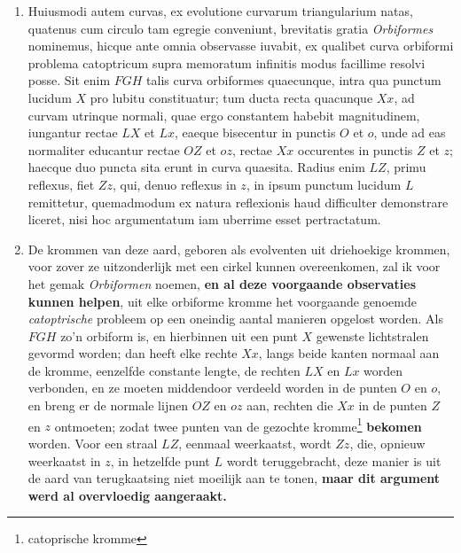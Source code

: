 \documentclass[10pt,a4paper]{article}
\newcommand{\switchenum}{\setcounter{enumi}{\arabic{enumi}-1}\switchcolumn}
\begin{document}
\begin{paracol}{2}
\begin{enumerate}[topsep=1px]
		
		\switchcolumn*
		
		
		
		\item Huiusmodi autem curvas, ex evolutione curvarum triangularium natas, quatenus cum circulo tam egregie conveniunt, brevitatis gratia \textit{Orbiformes} nominemus, hicque ante omnia observasse iuvabit, ex qualibet curva orbiformi problema catoptricum supra memoratum infinitis modus facillime resolvi posse. Sit enim $FGH$ talis curva orbiformes quaecunque, intra qua punctum lucidum $X$ pro lubitu constituatur; tum ducta recta quacunque $Xx$, ad curvam utrinque normali, quae ergo constantem habebit magnitudinem, iungantur rectae $LX$ et $Lx$, eaeque bisecentur in punctis $O$ et $o$, unde ad eas normaliter educantur rectae $OZ$ et $oz$, rectae $Xx$ occurentes in punctis $Z$ et $z$; haecque duo puncta sita erunt in curva quaesita. Radius enim $LZ$, primu reflexus, fiet $Zz$, qui, denuo reflexus in $z$, in ipsum punctum lucidum $L$ remittetur, quemadmodum ex natura reflexionis haud difficulter demonstrare liceret, nisi hoc argumentatum iam uberrime esset pertractatum.
		
		\switchenum
		\item De krommen van deze aard, geboren als evolventen uit driehoekige krommen, voor zover ze uitzonderlijk met een cirkel kunnen overeenkomen, zal ik voor het gemak \textit{Orbiformen} noemen, \textbf{en al deze voorgaande observaties  kunnen helpen}, uit elke orbiforme kromme het voorgaande genoemde \textit{catoptrische} probleem op een oneindig aantal manieren opgelost worden. Als $FGH$ zo'n orbiform is, en hierbinnen uit een punt $X$ gewenste lichtstralen gevormd worden; dan heeft elke rechte $Xx$, langs beide kanten normaal aan de kromme, eenzelfde constante lengte, de rechten $LX$ en $Lx$ worden verbonden, en ze moeten middendoor verdeeld worden in de punten $O$ en $o$, en breng er de normale lijnen $OZ$ en $oz$ aan, rechten die $Xx$ in de punten $Z$ en $z$ ontmoeten; zodat twee punten van de gezochte kromme\footnote{catoprische kromme} \textbf{bekomen} worden. Voor een straal $LZ$, eenmaal weerkaatst, wordt $Zz$, die,  opnieuw weerkaatst in $z$, in hetzelfde punt $L$ wordt teruggebracht, deze manier is uit de aard van terugkaatsing niet moeilijk aan te tonen, \textbf{maar dit argument werd al overvloedig aangeraakt.}
		\switchcolumn*
		

\end{enumerate}
\end{paracol}
\end{document}
